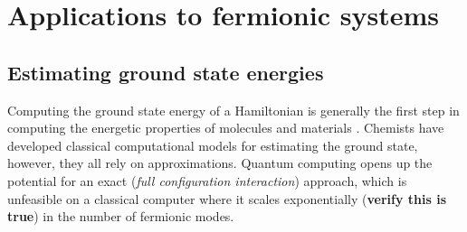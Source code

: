 \documentclass[twoside]{article}
\begin{document}
\section{Applications to fermionic systems}\label{applications_section}
\subsection{Estimating ground state energies}
Computing the ground state energy of a Hamiltonian is generally the first step in computing the energetic properties of molecules and materials \cite{vqe}. Chemists have developed classical computational models for estimating the ground state, however, they all rely on approximations. Quantum computing opens up the potential for an exact (\textit{full configuration interaction}) approach, which is unfeasible on a classical computer where it scales exponentially (\textbf{verify this is true}) in the number of fermionic modes.
\end{document}

